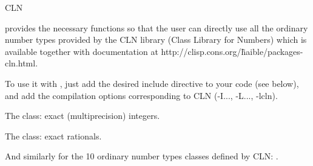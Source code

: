 
\begin{ccClass} {CLN}  %
\label{cln}

{\cgal} provides the necessary functions so that the user can directly use
all the ordinary  number types provided by the CLN library (Class Library for
Numbers) which is available together with documentation at
http://clisp.cons.org/\~haible/packages-cln.html. %

To use it with {\cgal}, just add the desired include directive to your code
(see below), and add the compilation options corresponding to CLN (-I...,
-L..., -lcln).


The  class: exact (multiprecision) integers.


The  class: exact rationals.

And similarly for the 10 ordinary number types classes defined by CLN:
.

\end{ccClass}
